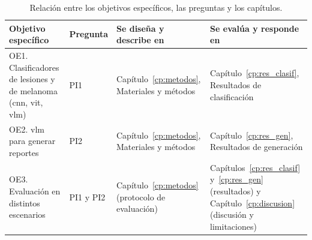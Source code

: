 \begin{table}[H]
  \centering
  \caption{Relación entre los objetivos específicos, las preguntas y los capítulos.}
  \label{tab:intro_objetivos_preguntas}
  \small
  \begin{tabularx}{\textwidth}{@{}>{\raggedright\arraybackslash}p{}p{}
    >{\raggedright\arraybackslash}X>{\raggedright\arraybackslash}X@{}}
    \toprule
    \textbf{Objetivo específico} & \textbf{Pregunta} & \textbf{Se diseña y describe en} & \textbf{Se evalúa y responde en} \\
    \midrule
    OE1. Clasificadores de lesiones y de melanoma (\gls{cnn}, \gls{vit}, \gls{vlm}) & PI1 &
      Capítulo~\ref{cp:metodos}, Materiales y métodos &
      Capítulo~\ref{cp:res_clasif}, Resultados de clasificación \\
    \filasep
    OE2. \gls{vlm} para generar reportes & PI2 &
      Capítulo~\ref{cp:metodos}, Materiales y métodos &
      Capítulo~\ref{cp:res_gen}, Resultados de generación \\
    \filasep
    OE3. Evaluación en distintos escenarios & PI1 y PI2 &
      Capítulo~\ref{cp:metodos} (protocolo de evaluación) &
      Capítulos~\ref{cp:res_clasif} y~\ref{cp:res_gen} (resultados) y Capítulo~\ref{cp:discusion} (discusión y
      limitaciones) \\
    \bottomrule
  \end{tabularx}
\end{table}
